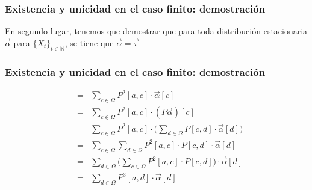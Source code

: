 \begin{frame}
\frametitle{Existencia y unicidad en el caso finito: demostración}

{\footnotesize

En segundo lugar, tenemos que demostrar que para toda distribución estacionaria $\vec \alpha$ para $\{ X_t \}_{t \in \mathbb{N}}$, se tiene que $\vec \alpha = \vec \pi$


}

\end{frame}


\begin{frame}
\frametitle{Existencia y unicidad en el caso finito: demostración}

{\footnotesize

\begin{eqnarray*}
& = & \sum_{c \in \Omega} P^2[a,c] \cdot \vec \alpha[c]\\
& = & \sum_{c \in \Omega} P^2[a,c] \cdot (P \vec \alpha)[c]\\
& = & \sum_{c \in \Omega} P^2[a,c] \cdot \bigg(\sum_{d \in \Omega} P[c,d] \cdot \vec \alpha[d]\bigg)\\
& = & \sum_{c \in \Omega} \sum_{d \in \Omega} P^2[a,c] \cdot P[c,d] \cdot \vec \alpha[d]\\
& = & \sum_{d \in \Omega} \bigg(\sum_{c \in \Omega} P^2[a,c] \cdot P[c,d]\bigg) \cdot \vec \alpha[d]\\
& = & \sum_{d \in \Omega} P^3[a,d] \cdot \vec \alpha[d]
\end{eqnarray*}
}

\end{frame}


